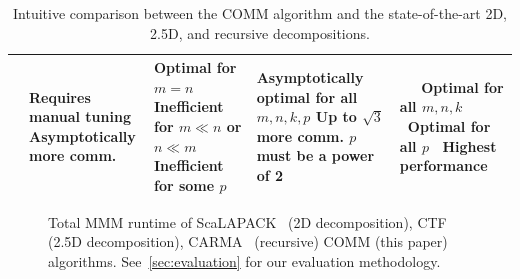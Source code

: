 \documentclass[sigplan,review,anonymous,10pt]{acmart}\settopmatter{printfolios=true,printccs=false,printacmref=false}
\begin{document}
\begin{table}
\begin{tabular}{lllll}
		&
		\makecell[l] {
			\faThumbsDown Requires manual tuning  \\
			\faThumbsDown Asymptotically
			more comm.  
		}
		&
		\makecell[l] {
			\faThumbsOUp Optimal for $m=n$  \\
			\faThumbsDown Inefficient for 
			$m \ll n$ 
			or $n \ll m$  \\
			\faThumbsDown Inefficient for some $p$
		}
		&
		\makecell[l] {
			\faThumbsOUp Asymptotically 
			optimal 
			for all  $m,n,k,p$  \\
			\faThumbsDown Up to $\sqrt{3}$ more comm.\\
			\faThumbsDown $p$ must be 
			a power of 2  
		}
		& 
		\makecell[l] {
			\faThumbsOUp ~ ~Optimal for 
			all $m,n,k$  \\
			\faThumbsOUp ~ ~Optimal for
			all $p$  \\
			\faThumbsOUp \faThumbsOUp ~Highest performance
		}
		\\
		\bottomrule
	\end{tabular}
	\caption{Intuitive comparison between the COMM algorithm and the 
		state-of-the-art 2D, 2.5D, and recursive decompositions.
	}
	\vspace{-0.5em}
	\label{tab:intro}
\end{table}


\begin{figure}
	\centering
	\hfill
	\vspace{-0.5em}
	\caption{Total MMM runtime of ScaLAPACK~\cite{scalapack} (2D 
	decomposition), CTF~\cite{cyclops} (2.5D decomposition),  
	CARMA~\cite{CARMA} (recursive)  COMM (this paper) algorithms. 
	See~\cref{sec:evaluation} for our evaluation 
	methodology. }
	\label{fig:introPlot}
	\vspace{-1em}
\end{figure}
\end{document}
